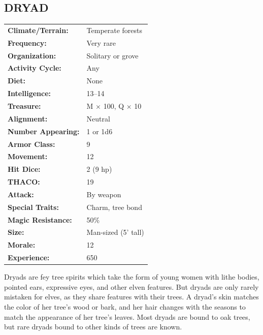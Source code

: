 \begin{multicols}{2}
\begin{minipage}{\columnwidth}
\vspace{1em}

\subsection{DRYAD}

\noindent \begin{tabular}{p{}p{}}
\textbf{Climate/Terrain:}	& Temperate forests \\
\textbf{Frequency:} 		& Very rare \\
\textbf{Organization:} 		& Solitary or grove \\
\textbf{Activity Cycle:} 	& Any \\
\textbf{Diet:} 				& None	\\
\textbf{Intelligence:} 		& 13--14 \\
\textbf{Treasure:} 			& M $\times$ 100, Q $\times$ 10 \\
\textbf{Alignment:} 		& Neutral \\
\hline
\textbf{Number Appearing:} 	& 1 or 1d6 \\
\textbf{Armor Class:} 		& 9 \\
\textbf{Movement:} 			& 12 \\
\textbf{Hit Dice:} 			& 2 (9 hp) \\
\textbf{THACO:} 			& 19 \\
\textbf{Attack:} 			& By weapon \\
\textbf{Special Traits:} 	& Charm, tree bond \\
\textbf{Magic Resistance:} 	& 50\% \\
\textbf{Size:} 				& Man-sized (5' tall) \\
\textbf{Morale:} 			& 12 \\
\textbf{Experience:} 		& 650 \\ %
\end{tabular}

\end{minipage}

Dryads are fey tree spirits which take the form of young women with lithe bodies, pointed ears, expressive eyes, and other elven features. But dryads are only rarely mistaken for elves, as they share features with their trees. A dryad's skin matches the color of her tree's wood or bark, and her hair changes with the seasons to match the appearance of her tree's leaves. Most dryads are bound to oak trees, but rare dryads bound to other kinds of trees are known. 


\end{multicols}
